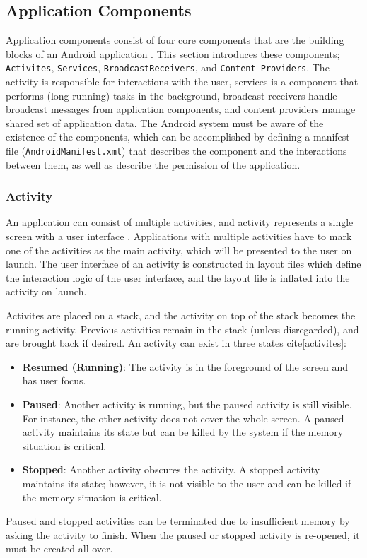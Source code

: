 \subsection{Application Components}
Application components consist of four core components that are the building blocks of an Android application \cite{appfundamentals}. This section introduces these components; \verb|Activites|, \verb|Services|, \verb|BroadcastReceivers|, and \verb|Content Providers|. The activity is responsible for interactions with the user, services is a component that performs (long-running) tasks in the background, broadcast receivers handle broadcast messages from application components, and content providers manage shared set of application data. The Android system must be aware of the existence of the components, which can be accomplished by defining a manifest file (\verb|AndroidManifest.xml|) that describes the component and the interactions between them, as well as describe the permission of the application. 


\subsubsection{Activity}
An application can consist of multiple activities, and activity represents a single screen with a user interface \cite{activities}. Applications with multiple activities have to mark one of the activities as the main activity, which will be presented to the user on launch. The user interface of an activity is constructed in layout files which define the interaction logic of the user interface, and the layout file is inflated into the activity on launch. 

Activites are placed on a stack, and the activity on top of the stack becomes the running activity. Previous activities remain in the stack (unless disregarded), and are brought back if desired.  An activity can exist in three states cite[activites]:

\begin{itemize}
    \item \textbf{Resumed (Running)}: The activity is in the foreground of the screen and has user focus. 
    \item \textbf{Paused}: Another activity is running, but the paused activity is still visible. For instance, the other activity does not cover the whole screen. A paused activity maintains its state but can be killed by the system if the memory situation is critical.  
    \item \textbf{Stopped}: Another activity obscures the activity. A stopped activity maintains its state; however, it is not visible to the user and can be killed if the memory situation is critical.
\end{itemize}
Paused and stopped activities can be terminated due to insufficient memory by asking the activity to finish. When the paused or stopped activity is re-opened, it must be created all over. 

